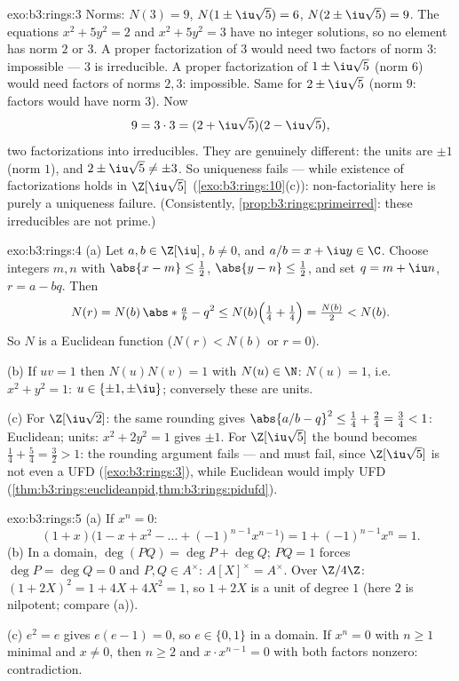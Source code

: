\begin{solution}{exo:b3:rings:3}
Norms: $N(3) = 9$, $N(1 \pm \iu\sqrt5) = 6$, $N(2 \pm \iu\sqrt5) =
9$. The equations $x^2 + 5y^2 = 2$ and $x^2 + 5y^2 = 3$ have no
integer solutions, so no element has norm $2$ or $3$. A proper
factorization of $3$ would need two factors of norm $3$:
impossible --- $3$ is irreducible. A proper factorization of $1
\pm \iu\sqrt5$ (norm $6$) would need factors of norms $2, 3$:
impossible. Same for $2 \pm \iu\sqrt5$ (norm $9$: factors would
have norm $3$). Now
\[
9 = 3 \cdot 3 = (2 + \iu\sqrt5)(2 - \iu\sqrt5),
\]
two factorizations into irreducibles. They are genuinely
different: the units are $\pm 1$ (norm $1$), and $2 \pm \iu\sqrt5
\neq \pm 3$. So uniqueness fails --- while existence of
factorizations holds in $\Z[\iu\sqrt5]$
(\cref{exo:b3:rings:10}(c)): non-factoriality here is purely a
uniqueness failure. (Consistently, \cref{prop:b3:rings:primeirred}:
these irreducibles are not prime.)
\end{solution}

\begin{solution}{exo:b3:rings:4}
(a) Let $a, b \in \Z[\iu]$, $b \neq 0$, and $a/b = x + \iu y \in
\C$. Choose integers $m, n$ with $\abs{x - m} \leq \frac12$,
$\abs{y - n} \leq \frac12$, and set $q = m + \iu n$, $r = a - bq$.
Then
\[
N(r) = N(b)\,\abs*{\tfrac ab - q}^2
\leq N(b)\Bigl(\tfrac14 + \tfrac14\Bigr) = \tfrac{N(b)}2 < N(b).
\]
So $N$ is a Euclidean function ($N(r) < N(b)$ or $r = 0$).

(b) If $uv = 1$ then $N(u)N(v) = 1$ with $N(u) \in \N$: $N(u) =
1$, i.e.\ $x^2 + y^2 = 1$: $u \in \{\pm 1, \pm\iu\}$; conversely
these are units.

(c) For $\Z[\iu\sqrt2]$: the same rounding gives $\abs{a/b - q}^2
\leq \frac14 + \frac{2}4 = \frac34 < 1$: Euclidean; units: $x^2 +
2y^2 = 1$ gives $\pm 1$. For $\Z[\iu\sqrt5]$ the bound becomes
$\frac14 + \frac54 = \frac32 > 1$: the rounding argument fails ---
and must fail, since $\Z[\iu\sqrt5]$ is not even a UFD
(\cref{exo:b3:rings:3}), while Euclidean would imply UFD
(\cref{thm:b3:rings:euclideanpid,thm:b3:rings:pidufd}).
\end{solution}

\begin{solution}{exo:b3:rings:5}
(a) If $x^n = 0$:
\[
(1 + x)\bigl(1 - x + x^2 - \dots + (-1)^{n-1}x^{n-1}\bigr)
= 1 + (-1)^{n-1}x^n = 1 .
\]
(b) In a domain, $\deg(PQ) = \deg P + \deg Q$; $PQ = 1$ forces
$\deg P = \deg Q = 0$ and $P, Q \in A^\times$: $A[X]^\times =
A^\times$. Over $\Z/4\Z$: $(1 + 2X)^2 = 1 + 4X + 4X^2 = 1$, so $1
+ 2X$ is a unit of degree $1$ (here $2$ is nilpotent; compare
(a)).

(c) $e^2 = e$ gives $e(e - 1) = 0$, so $e \in \{0, 1\}$ in a
domain. If $x^n = 0$ with $n \geq 1$ minimal and $x \ne 0$, then
$n \geq 2$ and $x \cdot x^{n-1} = 0$ with both factors nonzero:
contradiction.
\end{solution}


